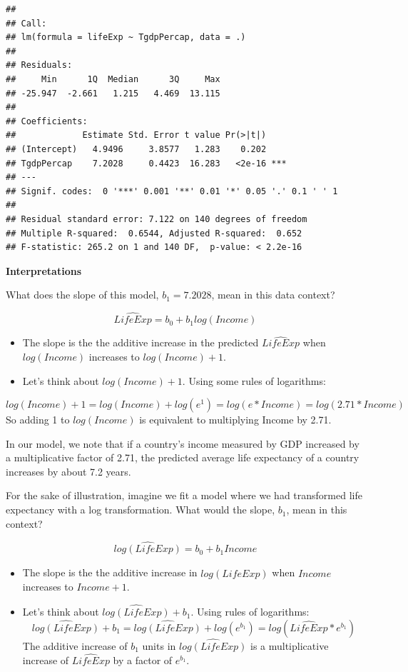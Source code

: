\documentclass[]{book}
\begin{document}
\begin{verbatim}
## 
## Call:
## lm(formula = lifeExp ~ TgdpPercap, data = .)
## 
## Residuals:
##     Min      1Q  Median      3Q     Max 
## -25.947  -2.661   1.215   4.469  13.115 
## 
## Coefficients:
##             Estimate Std. Error t value Pr(>|t|)    
## (Intercept)   4.9496     3.8577   1.283    0.202    
## TgdpPercap    7.2028     0.4423  16.283   <2e-16 ***
## ---
## Signif. codes:  0 '***' 0.001 '**' 0.01 '*' 0.05 '.' 0.1 ' ' 1
## 
## Residual standard error: 7.122 on 140 degrees of freedom
## Multiple R-squared:  0.6544, Adjusted R-squared:  0.652 
## F-statistic: 265.2 on 1 and 140 DF,  p-value: < 2.2e-16
\end{verbatim}

\textbf{Interpretations}

What does the slope of this model, \(b_1 = 7.2028\), mean in this data context?

\[\widehat{LifeExp} = b_0 + b_1 log(Income)\]

\begin{itemize}
\item
  The slope is the the additive increase in the predicted \(\widehat{LifeExp}\) when \(log(Income)\) increases to \(log(Income) + 1\).
\item
  Let's think about \(log(Income) + 1\). Using some rules of logarithms:
\end{itemize}

\[log(Income) + 1 = log(Income) + log(e^1) = log(e*Income) = log(2.71*Income)\]
So adding 1 to \(log(Income)\) is equivalent to multiplying Income by 2.71.

In our model, we note that if a country's income measured by GDP increased by a multiplicative factor of 2.71, the predicted average life expectancy of a country increases by about 7.2 years.

For the sake of illustration, imagine we fit a model where we had transformed life expectancy with a log transformation. What would the slope, \(b_1\), mean in this context?

\[\widehat{log(LifeExp)} = b_0 + b_1 Income\]

\begin{itemize}
\item
  The slope is the the additive increase in \(\widehat{log(LifeExp)}\) when \(Income\) increases to \(Income + 1\).
\item
  Let's think about \(\widehat{log(LifeExp)} + b_1\). Using rules of logarithms:
  \[\widehat{log(LifeExp)} + b_1 = \widehat{log(LifeExp)} + log(e^{b_1}) = log(\widehat{LifeExp} * e^{b_1}) \]
  The additive increase of \(b_1\) units in \(\widehat{log(LifeExp)}\) is a multiplicative increase of \(\widehat{LifeExp}\) by a factor of \(e^{b_1}\).
\end{itemize}
\end{document}
